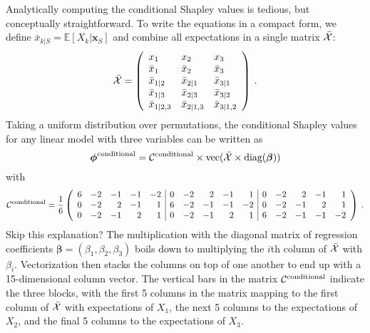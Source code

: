 \documentclass{article}
\newcommand{\vX}{\mathbf{X}}
\newcommand{\vx}{\mathbf{x}}
\newcommand{\expectation}{\mathbb{E}}
\newcommand{\contribution}{{\phi}}
\newcommand{\dodo}{\mathit{do}}
\newcommand{\lvdo}[1]{\dodo(\vX_{#1} = \vx_{#1})}
\newcommand{\bx}{\bar{x}}
\newcommand{\hx}{\hat{x}}
\newcommand{\allmeans}{{\cal X}}
\newcommand{\diagbeta}{{\cal B}}
\newcommand{\contmat}{{\cal C}}
\newcommand{\boven}[2]{#1^{\mbox{\scriptsize #2}}}
\newcommand{\comment}[1]{{\color{red} #1}}
\begin{document}
Analytically computing the conditional Shapley values is tedious, but conceptually straightforward. To write the equations in a compact form, we define $\bx_{k|S} = \expectation[X_k|\vx_{S}]$ and combine all expectations in a single matrix $\bar{\allmeans}$:
\[
\bar{\allmeans} = \left(\begin{array}{lll}
x_1 & x_2 & x_3 \\
\bx_1 & \bx_2 & \bx_3 \\
\bx_{1|2} & \bx_{2|1} & \bx_{3|1} \\
\bx_{1|3} & \bx_{2|3} & \bx_{3|2} \\
\bx_{1|2,3} &  \bx_{2|1,3} & \bx_{3|1,2}
\end{array}\right)
\: .
\]
Taking a uniform distribution over permutations, the conditional Shapley values for any linear model with three variables can be written as
\begin{equation}
\boven{\bm{\contribution}}{conditional} = \boven{\contmat}{conditional} \times \mathop{\textrm{vec}}(\bar{\allmeans} \times \mathop{\textrm{diag}}(\bm{\beta}))
\label{eq:shapvec}
\end{equation}
with
\[
\boven{\contmat}{conditional} = {1 \over 6} \left(\begin{array}{rrrrr|rrrrr|rrrrr}
6 & -2 & -1 & -1 & -2  &
0 & -2 & 2 & -1 & 1  &
0 & -2 & 2 & -1 & 1 \\ 
0 & -2 & 2 & -1 & 1  &
6 & -2 & -1 & -1 & -2  &
0 & -2 & -1 & 2 & 1 \\ 
0 & -2 & -1 & 2 & 1  &
0 & -2 & -1 & 2 & 1  &
6 & -2 & -1 & -1 & -2
\end{array}\right) \: .
\]
\comment{Skip this explanation?}
The multiplication with the diagonal matrix of regression coefficients $\bm{\beta} = (\beta_1,\beta_2,\beta_3)$ boils down to multiplying the $i$th column of $\bar{\allmeans}$ with $\beta_i$. Vectorization then stacks the columns on top of one another to end up with a 15-dimensional column vector. The vertical bars in the matrix $\boven{\contmat}{conditional}$ indicate the three blocks, with the first 5 columns in the matrix mapping to the first column of $\bar{\allmeans}$ with expectations of $X_1$, the next 5 columns to the expectations of $X_2$, and the final 5 columns to the expectations of $X_3$.
\end{document}
